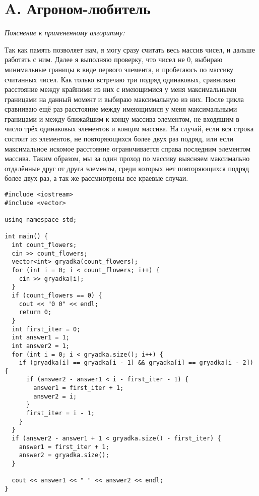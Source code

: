 \section{A. Агроном-любитель}
\textit{Пояснение к примененному алгоритму:} \par
Так как память позволяет нам, я могу сразу считать весь массив чисел, и дальше работать с ним.
Далее я выполняю проверку, что чисел не 0, выбираю минимальные границы в виде первого элемента, и пробегаюсь по массиву считанных чисел.
Как только встречаю три подряд одинаковых, сравниваю расстояние между крайними из них с имеющимися у меня максимальными границами на данный момент и выбираю максимальную из них.
После цикла сравниваю ещё раз расстояние между имеющимися у меня максимальными границами и между ближайшим к концу массива элементом, не входящим в число трёх одинаковых элементов и концом массива.
На случай, если вся строка состоит из элементов, не повторяющихся более двух раз подряд, или если максимальное искомое расстояние ограничивается справа последним элементом массива.
Таким образом, мы за один проход по массиву выясняем максимально отдалённые друг от друга элементы, среди которых нет повторяющихся подряд более двух раз, а так же рассмиотрены все краевые случаи.
\tiny
\begin{verbatim}
#include <iostream>
#include <vector>

using namespace std;

int main() {
  int count_flowers;
  cin >> count_flowers;
  vector<int> gryadka(count_flowers);
  for (int i = 0; i < count_flowers; i++) {
    cin >> gryadka[i];
  }
  if (count_flowers == 0) {
    cout << "0 0" << endl;
    return 0;
  }
  int first_iter = 0;
  int answer1 = 1;
  int answer2 = 1;
  for (int i = 0; i < gryadka.size(); i++) {
    if (gryadka[i] == gryadka[i - 1] && gryadka[i] == gryadka[i - 2]) {
      if (answer2 - answer1 < i - first_iter - 1) {
        answer1 = first_iter + 1;
        answer2 = i;
      }
      first_iter = i - 1;
    }
  }
  if (answer2 - answer1 + 1 < gryadka.size() - first_iter) {
    answer1 = first_iter + 1;
    answer2 = gryadka.size();
  }

  cout << answer1 << " " << answer2 << endl;
}
\end{verbatim}
\normalsize
\BgThispage
\newpage

